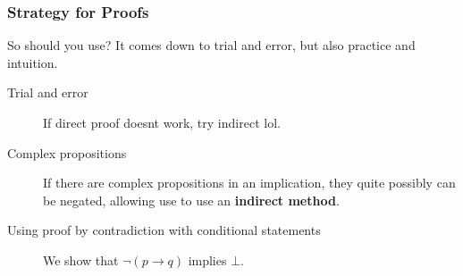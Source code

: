 \documentclass[11pt]{article}
\begin{document}
\subsubsection{Strategy for Proofs}
\label{sec:org1616cee}
So should you use? It comes down to trial and error, but also practice and intuition.
\begin{description}
\item[{Trial and error}] If direct proof doesnt work, try indirect lol.
\item[{Complex propositions}] If there are complex propositions in an implication, they quite possibly can be negated, allowing use to use an \textbf{indirect method}.
\item[{Using proof by contradiction with conditional statements}] We show that \(\neg (p \to q)\) implies \(\bot\).
\end{description}
\end{document}
